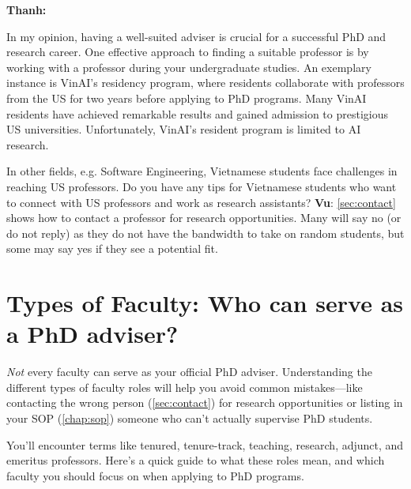 \documentclass[oneside,11pt]{book}
\newenvironment{commentbox}[1][]{
  \small
  \begin{marker}[\faChessPawn{}]
    {\textbf{#1}}
  }{
  \end{marker}
}
\begin{document}
\begin{commentbox}[Thanh:]
  In my opinion, having a well-suited adviser is crucial for a successful PhD and research career. One effective approach to finding a suitable professor is by working with a professor during your undergraduate studies. An exemplary instance is VinAI's residency program, where residents collaborate with professors from the US for two years before applying to PhD programs. Many VinAI residents have achieved remarkable results and gained admission to prestigious US universities. Unfortunately, VinAI's resident program is limited to AI research.

  In other fields, e.g. Software Engineering, Vietnamese students face challenges in reaching US professors. Do you have any tips for Vietnamese students who want to connect with US professors and work as research assistants?
  \tcblower
  \textbf{Vu}: \autoref{sec:contact} shows how to contact a professor for research opportunities. Many will say no (or do not reply) as they do not have the bandwidth to take on random students, but some may say yes if they see a potential fit.
\end{commentbox}


\section{Types of Faculty: Who can serve as a PhD adviser?}\label{sec:faculty-types}

\emph{Not} every faculty can serve as your official PhD adviser. Understanding the different types of faculty roles will help you avoid common mistakes—like contacting the wrong person (\autoref{sec:contact}) for research opportunities or listing in your SOP (\autoref{chap:sop}) someone who can't actually supervise PhD students.

You'll encounter terms like tenured, tenure-track, teaching, research, adjunct, and emeritus professors. Here's a quick guide to what these roles mean, and which faculty you should focus on when applying to PhD programs.
\end{document}
